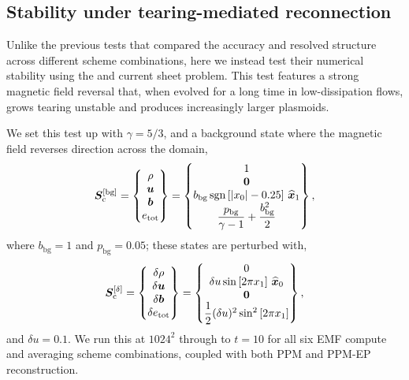 \subsection{Stability under tearing-mediated reconnection}
\label{sec:scheme-comparison:reconnection}

Unlike the previous tests that compared the accuracy and resolved structure across different scheme combinations, here we instead test their numerical stability using the \citet{HawleyStone95a} and \citet{Stone08a} current sheet problem. This test features a strong magnetic field reversal that, when evolved for a long time in low-dissipation flows, grows tearing unstable and produces increasingly larger plasmoids.

We set this test up with $\gamma = 5/3$, and a background state where the magnetic field reverses direction across the domain,
\begin{align}
    \bm{S}_\mathrm{c}^{[\mathrm{bg}]}
        = \begin{Bmatrix}
                \rho \\
                \bm{u} \\
                \bm{b} \\
                e_\mathrm{tot}
            \end{Bmatrix}
        = \begin{Bmatrix}
                1 \\
                \bm{0} \\
                b_\mathrm{bg} \, \mathrm{sgn}\left[ |x_0| - 0.25 \right] \, \widehat{\bm{x}}_1 \\
                \dfrac{p_\mathrm{bg}}{\gamma-1} + \dfrac{b_\mathrm{bg}^2}{2}
            \end{Bmatrix}
    ,
\end{align}
where $b_\mathrm{bg} = 1$ and $p_\mathrm{bg} = 0.05$; these states are perturbed with,
\begin{align}
    \bm{S}_\mathrm{c}^{[\delta]}
        = \begin{Bmatrix}
                \delta\rho \\
                \delta \bm{u} \\
                \delta \bm{b} \\
                \delta e_\mathrm{tot}
            \end{Bmatrix}
        = \begin{Bmatrix}
                0 \\
                \delta u \sin\left[ 2\pi x_1 \right] \, \widehat{\bm{x}}_0 \\
                \bm{0} \\
                \dfrac{1}{2} (\delta u)^2 \sin^2\left[ 2\pi x_1 \right]
            \end{Bmatrix},
\end{align}
and $\delta u = 0.1$. We run this at $1024^2$ through to $t = 10$ for all six EMF compute and averaging scheme combinations, coupled with both PPM and PPM-EP reconstruction.

